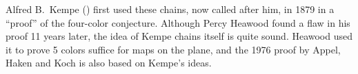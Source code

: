 \documentclass[12pt]{article}
\begin{document}


Alfred B.\ Kempe
()
first used these chains, now called after him,
in 1879 in a ``proof'' of the four-color conjecture. Although Percy Heawood
found a flaw in his proof 11 years later, the idea of Kempe chains itself is
quite sound. Heawood used it to prove 5 colors suffice for maps on the plane,
and the 1976 proof by Appel, Haken and Koch is also based on Kempe's ideas.
\end{document}
